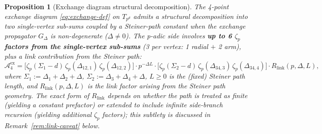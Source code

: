 \documentclass[11pt,a4paper]{article}
\newtheorem{proposition}{Proposition}
\begin{document}
\begin{proposition}[Exchange diagram structural decomposition]
\label{prop:exchange}
The 4-point exchange diagram \eqref{eq:exchange-def} on $T_{p^d}$ admits a structural decomposition into two single-vertex sub-sums coupled by a Steiner-path constant when the exchange propagator $G_\Delta$ is non-degenerate ($\Delta \neq 0$). The p-adic side involves \textbf{up to 6 $\zeta_p$ factors from the single-vertex sub-sums} (3 per vertex: 1 radial $+$ 2 arm), plus a \emph{link contribution} from the Steiner path:
\begin{equation}
\label{eq:exchange-factors}
\mathcal{A}^{\mathrm{ex}}_4 = \Big[\zeta_p(\Sigma_1{-}d)\,\zeta_p(\Delta_{12,1})\,\zeta_p(\Delta_{12,2})\Big] \cdot p^{-\Delta L} \cdot \Big[\zeta_p(\Sigma_2{-}d)\,\zeta_p(\Delta_{34,3})\,\zeta_p(\Delta_{34,4})\Big] \cdot R_{\mathrm{link}}(p, \Delta, L),
\end{equation}
where $\Sigma_1 := \Delta_1 + \Delta_2 + \Delta$, $\Sigma_2 := \Delta_3 + \Delta_4 + \Delta$, $L \geq 0$ is the (fixed) Steiner path length, and $R_{\mathrm{link}}(p, \Delta, L)$ is the \emph{link factor} arising from the Steiner path geometry. The exact form of $R_{\mathrm{link}}$ depends on whether the path is treated as finite (yielding a constant prefactor) or extended to include infinite side-branch recursion (yielding additional $\zeta_p$ factors); this subtlety is discussed in Remark~\ref{rem:link-caveat} below.
\end{proposition}
\end{document}
